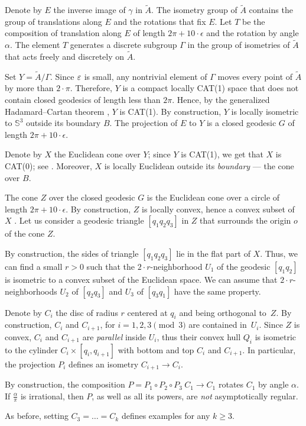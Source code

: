 \documentclass[a4paper,10pt]{article}
\begin{document}
Denote by $E$ the inverse image of $\gamma$ in $\tilde A$.
The isometry group of $\tilde A$ 
contains the group of translations along $E$ and 
the rotations that fix $E$.
Let $T$  be the composition of translation along $E$  of length $2\pi +10\cdot\epsilon$ and the rotation by angle $\alpha$.
The element $T$ generates a discrete subgroup $\Gamma$ in the group of isometries  of $\tilde A$ that acts freely and discretely on $\tilde A$.

Set $Y =\tilde A/\Gamma$.
Since $\varepsilon$ is small, any nontrivial element of $\Gamma$ moves
every point of $\tilde A$ by more than $2\cdot\pi$.
Therefore, $Y$ is a compact locally CAT(1) space that does not contain closed geodesics of length less than $2\pi$.
Hence, by  the generalized Hadamard--Cartan theorem \cite{AKP}, $Y$ is CAT(1).
By construction, $Y$ is locally isometric to $\mathbb{S}^3$ outside its boundary $B$.
The projection of $E$ to $Y$ is a closed geodesic $G$ of length $2\pi +10\cdot\epsilon$.

Denote by $X$ the Euclidean cone over $Y$;
since $Y$ is CAT(1), we get that $X$ is CAT(0); see \cite{AKP}.
Moreover, $X$ is locally Euclidean outside its \emph{boundary} --- the cone over $B$.

The cone $Z$ over the closed geodesic $G$ is  the Euclidean cone over a circle of length $2\pi +10\cdot\epsilon$.
By construction, $Z$ is locally convex, hence a convex subset of~$X$ \cite[2.2.12]{AKP_inv}.
Let us consider a geodesic triangle
$[q_1q_2q_3]$
in $Z$ that surrounds the origin $o$ of the cone $Z$.

By construction, the sides of triangle $[q_1q_2q_3]$ lie in the flat part of $X$.
Thus, we can find a small $r>0$ such that the $2\cdot r$-neighborhood $U_1$ of the geodesic $[q_1q_2]$ is isometric to a convex subset of the Euclidean space.
We can assume that $2\cdot r$-neighborhoods $U_2$ of $[q_2q_3]$ and $U_3$ of $[q_3q_1]$ have the same property.

Denote by $C_i$ the disc of radius $r$ centered at $q_i$ and being orthogonal to~$Z$.
By construction, $C_i$ and $C_{i+1}$, for $i=1,2,3\pmod 3$   are contained in~$U_i$.
Since $Z$ is convex, $C_i$ and $C_{i+1}$ are \emph{parallel} inside $U_i$, thus their convex hull  $Q_i$ is isometric to the  cylinder $C_i \times [q_i,q_{i+1}]$ with bottom and top $C_i$ and $C_{i+1}$.
In particular, the projection $P_i$ defines an isometry $C_{i+1}\to C_{i}$.

By construction, the composition $P=P_1\circ P_2\circ P_3\:C_1\to C_1$ rotates $C_1$ by angle $\alpha$.
If $\tfrac\alpha\pi$ is irrational, then $P$, as well as all its powers, are \emph{not} asymptotically regular.

As before, setting $C_3=\dots=C_k$ defines examples for any $k\geq 3$.
\qeds


{\sloppy
\printbibliography[heading=bibintoc]
\fussy
}
\end{document}
